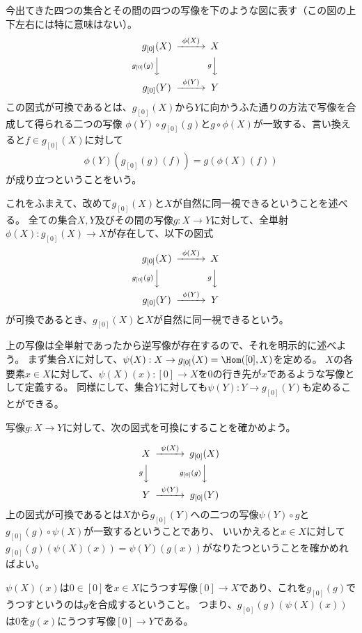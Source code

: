 \documentclass[uplatex]{jsarticle}
\begin{document}
今出てきた四つの集合とその間の四つの写像を下のような図に表す（この図の上下左右には特に意味はない）。
\[
\begin{CD}
g_{[0]}(X)@>\phi(X)>>X\\
@Vg_{[0]}(g)VV@VgVV\\
g_{[0]}(Y)@>\phi(Y)>>Y
\end{CD}
\]
この図式が可換であるとは、$g_{[0]}(X)$から$Y$に向かうふた通りの方法で写像を合成して得られる二つの写像
$\phi(Y)\circ g_{[0]}(g)$と$g\circ \phi(X)$が一致する、言い換えると$f\in g_{[0]}(X)$に対して
\begin{align*}
\phi(Y)(g_{[0]}(g)(f))=g(\phi(X)(f))
\end{align*}
が成り立つということをいう。

これをふまえて、改めて$g_{[0]}(X)$と$X$が自然に同一視できるということを述べる。
全ての集合$X, Y$及びその間の写像$g:X \to Y$に対して、全単射$\phi(X):g_{[0]}(X) \to X$が存在して、以下の図式
\[
\begin{CD}
g_{[0]}(X)@>\phi(X)>>X\\
@Vg_{[0]}(g)VV@VgVV\\
g_{[0]}(Y)@>\phi(Y)>>Y
\end{CD}
\]
が可換であるとき、$g_{[0]}(X)$と$X$が自然に同一視できるという。

\vspace{10pt}
上の写像は全単射であったから逆写像が存在するので、それを明示的に述べよう。
まず集合$X$に対して、$\psi(X):X \to g_{[0]}(X)=\Hom([0],X)$を定める。
$X$の各要素$x\in X$に対して、$\psi(X)(x):[0] \to X$を$0$の行き先が$x$であるような写像として定義する。
同様にして、集合$Y$に対しても$\psi(Y):Y \to g_{[0]}(Y)$も定めることができる。

写像$g:X \to Y$に対して、次の図式を可換にすることを確かめよう。

\[
\begin{CD}
X@>\psi(X)>>g_{[0]}(X)\\
@VgVV@Vg_{[0]}(g)VV\\
Y@>\psi(Y)>>g_{[0]}(Y)
\end{CD}
\]
上の図式が可換であるとは$X$から$g_{[0]}(Y)$への二つの写像$\psi(Y)\circ g$と$g_{[0]}(g)\circ \psi(X)$が一致するということであり、
いいかえると$x\in X$に対して$g_{[0]}(g)(\psi(X)(x))=\psi(Y)(g(x))$がなりたつということを確かめればよい。

$\psi(X)(x)$は$0\in[0]$を$x\in X$にうつす写像$[0] \to X$であり、これを$g_{[0]}(g)$でうつすというのは$g$を合成するということ。
つまり、$g_{[0]}(g)(\psi(X)(x))$は$0$を$g(x)$にうつす写像$[0] \to Y$である。
\end{document}
